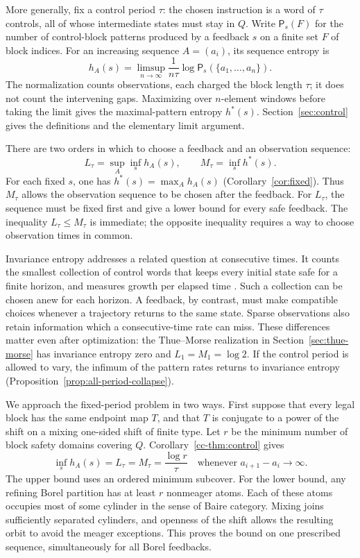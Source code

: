 \documentclass[11pt,reqno]{amsart}
\numberwithin{equation}{section}
\theoremstyle{definition}
\theoremstyle{definition}
\newcommand{\Patt}{\mathsf P}
\begin{document}
More generally, fix a control period $\tau$: the chosen instruction is
a word of $\tau$ controls, all of whose intermediate states must stay
in $Q$. Write $\Patt_s(F)$ for the number of control-block patterns
produced by a feedback $s$ on a finite set $F$ of block indices. For
an increasing sequence $A=(a_i)$, its sequence entropy is
\[
 h_A(s)=\limsup_{n\to\infty}\frac{1}{n\tau}
       \log\Patt_s(\{a_1,\ldots,a_n\}).
\]
The normalization counts observations, each charged the block length
$\tau$; it does not count the intervening gaps. Maximizing over
$n$-element windows before taking the limit gives the maximal-pattern
entropy $h^*(s)$. Section~\ref{sec:control} gives the definitions
and the elementary limit argument.

There are two orders in which to choose a feedback and an observation
sequence:
\[
 L_\tau=\sup_A\inf_s h_A(s),\qquad
 M_\tau=\inf_s h^*(s).
\]
For each fixed $s$, one has $h^*(s)=\max_A h_A(s)$
(Corollary~\ref{cor:fixed}). Thus $M_\tau$ allows the observation
sequence to be chosen after the feedback. For $L_\tau$, the sequence
must be fixed first and give a lower bound for every safe feedback.
The inequality $L_\tau\le M_\tau$ is immediate; the opposite
inequality requires a way to choose observation times in common.

Invariance entropy addresses a related question at consecutive times.
It counts the smallest collection of control words that keeps every
initial state safe for a finite horizon, and measures growth per
elapsed time \cite{Kawan2013}. Such a collection can be chosen anew
for each horizon. A feedback, by contrast, must make compatible choices
whenever a trajectory returns to the same state. Sparse observations
also retain information which a consecutive-time rate can miss. These
differences matter even after optimization: the Thue--Morse realization
in Section~\ref{sec:thue-morse} has invariance entropy zero and
$L_1=M_1=\log2$. If the control period is allowed to vary, the
infimum of the pattern rates returns to invariance entropy
(Proposition~\ref{prop:all-period-collapse}).

We approach the fixed-period problem in two ways. First suppose that
every legal block has the same endpoint map $T$, and that $T$ is
conjugate to a power of the shift on a mixing one-sided shift of finite
type. Let $r$ be the minimum number of block safety domains covering
$Q$. Corollary~\ref{cc-thm:control} gives
\[
 \inf_s h_A(s)=L_\tau=M_\tau=\frac{\log r}{\tau}
 \quad\text{whenever }a_{i+1}-a_i\longrightarrow\infty.
\]
The upper bound uses an ordered minimum subcover. For the lower bound,
any refining Borel partition has at least $r$ nonmeager atoms. Each of
these atoms occupies most of some cylinder in the sense of Baire
category. Mixing joins sufficiently separated cylinders, and openness
of the shift allows the resulting orbit to avoid the meager exceptions.
This proves the bound on one prescribed sequence, simultaneously for
all Borel feedbacks.
\end{document}
